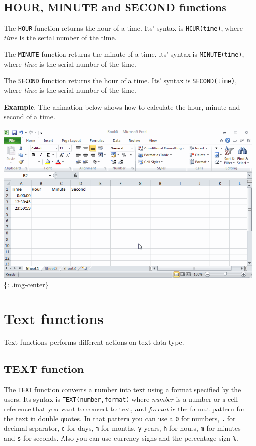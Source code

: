 \section{HOUR, MINUTE and SECOND functions}
\label{hourminuteandsecondfunctions}

The \texttt{HOUR} function returns the hour of a time. Its' syntax is \texttt{HOUR(time)}, where \emph{time} is the serial number of the time. 

The \texttt{MINUTE} function returns the minute of a time. Its' syntax is \texttt{MINUTE(time)}, where \emph{time} is the serial number of the time. 

The \texttt{SECOND} function returns the hour of a time. Its' syntax is \texttt{SECOND(time)}, where \emph{time} is the serial number of the time. 

\textbf{Example}. The animation below shows how to calculate the hour, minute and second of a time. 

\includegraphics[keepaspectratio,width=\textwidth,height=0.75\textheight]{img/example_function_hour.gif}
\{: .img-center\}

\chapter{Text functions}
\label{textfunctions}

Text functions performs different actions on text data type.

\section{TEXT function}
\label{textfunction}

The \texttt{TEXT} function converts a number into text using a format specified by the users. Its syntax is \texttt{TEXT(number,format)} where \emph{number} is a number or a cell reference that you want to convert to text, and \emph{format} is the format pattern for the text in double quotes. In that pattern you can use a \texttt{0} for numbers, \texttt{.} for decimal separator, \texttt{d} for days, \texttt{m} for months, \texttt{y} years, \texttt{h} for hours, \texttt{m} for minutes and \texttt{s} for seconds. Also you can use currency signs and the percentage sign \texttt{\%}. 

